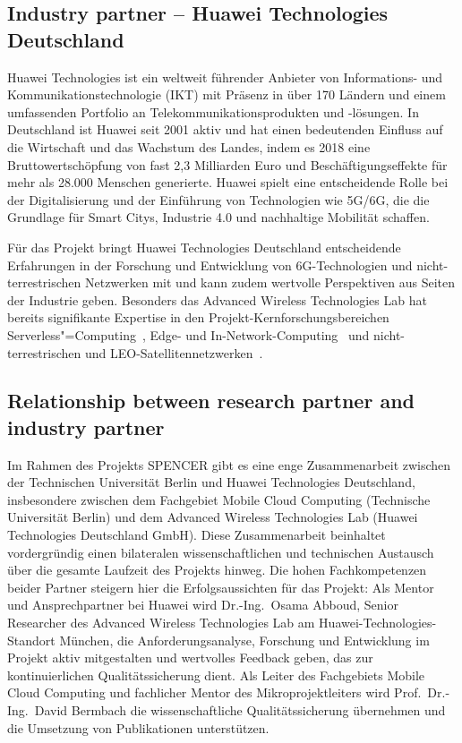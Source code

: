 \subsection{Industry partner -- Huawei Technologies Deutschland}
\label{sec:partner:industrie}

Huawei Technologies ist ein weltweit führender Anbieter von Informations- und Kommunikationstechnologie (IKT) mit Präsenz in über 170 Ländern und einem umfassenden Portfolio an Telekommunikationsprodukten und -lösungen.
In Deutschland ist Huawei seit 2001 aktiv und hat einen bedeutenden Einfluss auf die Wirtschaft und das Wachstum des Landes, indem es 2018 eine Bruttowertschöpfung von fast 2,3 Milliarden Euro und Beschäftigungseffekte für mehr als 28.000 Menschen generierte.
Huawei spielt eine entscheidende Rolle bei der Digitalisierung und der Einführung von Technologien wie 5G/6G, die die Grundlage für Smart Citys, Industrie 4.0 und nachhaltige Mobilität schaffen.

Für das Projekt bringt Huawei Technologies Deutschland entscheidende Erfahrungen in der Forschung und Entwicklung von 6G-Technologien und nicht-terrestrischen Netzwerken mit und kann zudem wertvolle Perspektiven aus Seiten der Industrie geben.
Besonders das Advanced Wireless Technologies Lab hat bereits signifikante Expertise in den Projekt-Kernforschungsbereichen Serverless"=Computing~\cite{10021037}, Edge- und In-Network-Computing~\cite{9996766} und nicht-terrestrischen und LEO-Satellitennetzwerken~\cite{10008593}.

\subsection{Relationship between research partner and industry partner}
\label{sec:partner:beziehung}


Im Rahmen des Projekts SPENCER gibt es eine enge Zusammenarbeit zwischen der Technischen Universität Berlin und Huawei Technologies Deutschland, insbesondere zwischen dem Fachgebiet Mobile Cloud Computing (Technische Universität Berlin) und dem Advanced Wireless Technologies Lab (Huawei Technologies Deutschland GmbH).
Diese Zusammenarbeit beinhaltet vordergründig einen bilateralen wissenschaftlichen und technischen Austausch über die gesamte Laufzeit des Projekts hinweg.
Die hohen Fachkompetenzen beider Partner steigern hier die Erfolgsaussichten für das Projekt:
Als Mentor und Ansprechpartner bei Huawei wird Dr.-Ing.~Osama Abboud, Senior Researcher des Advanced Wireless Technologies Lab am Huawei-Technologies-Standort München, die Anforderungsanalyse, Forschung und Entwicklung im Projekt aktiv mitgestalten und wertvolles Feedback geben, das zur kontinuierlichen Qualitätssicherung dient.
Als Leiter des Fachgebiets Mobile Cloud Computing und fachlicher Mentor des Mikroprojektleiters wird Prof.~Dr.-Ing.~David Bermbach die wissenschaftliche Qualitätssicherung übernehmen und die Umsetzung von Publikationen unterstützen.
